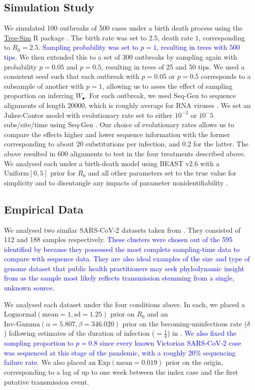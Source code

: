 \documentclass{article}
\begin{document}
{\subsection*{Simulation Study}
We simulated 100 outbreaks of 500 cases under a birth death process using the \url{Tree-Sim} R package \citep{TreeSim}. The birth rate was set to $2.5$, death rate $1$, corresponding to $R_{0} = 2.5$. \textcolor{blue}{Sampling probability was set to $p=1$, resulting in trees with 500 tips.} We then extended this to a set of 300 outbreaks by sampling again with probability $p=0.05$ and $p = 0.5$, resulting in trees of 25 and 50 tips. We used a consistent seed such that each outbreak with $p=0.05$ or $p=0.5$ corresponds to a subsample of another with $p=1$, allowing us to asses the effect of sampling proportion on inferring $W_{\bullet}$. For each outbreak, we used Seq-Gen to sequence alignments of length 20000, which is roughly average for RNA viruses \citep{sanjuan2010viral,rambaut_seq-gen_1997}. We set an Jukes-Cantor model with evolutionary rate set to either $10^{-3}$ or $10^-{5}$ subs/site/time using Seq-Gen \cite{rambaut_seq-gen_1997}.  Our choice of evolutionary rates allows us to compare the effects higher and lower sequence information with the former corresponding to about 20 substitutions per infection, and 0.2 for the latter. 
The above resulted in 600 alignments to test in the four treatments described above. We analysed each under a birth-death model using BEAST v2.6 \citet{bouckaert_beast_2019} with a $\textrm{Uniform}[0,5]$ prior for $R_0$ and all other parameters set to the true value for simplicity and to disentangle any impacts of parameter nonidentifiability \citep{louca2021fundamental}.

\subsection*{Empirical Data}
We analysed two similar SARS-CoV-2 datasets taken from \citet{lane2021genomics}. They consisted of 112 and 188 samples respectively. \textcolor{blue}{These clusters were chosen out of the 595 identified by \citet{lane2021genomics} because they possessed the most complete sampling-time data to compare with sequence data. They are also ideal examples of the size and type of genome dataset that public health practitioners may seek phylodynamic insight from as the sample most likely reflects transmission stemming from a single, unknown source.} 

We analysed  each dataset under the four conditions above. In each, we placed a $\textrm{Lognormal}(\textrm{mean}=1, \textrm{sd}=1.25)$ prior on $R_0$ and an $\textrm{Inv-Gamma}(\alpha=5.807, \beta=346.020)$ prior on the becoming-uninfectious rate ($\delta$) following estimates of the duration of infection ($=\frac{1}{\delta}$) in \cite{Lauer2020The}. \textcolor{blue}{We also fixed the sampling proportion to $p=0.8$ since every known Victorian SARS-CoV-2 case was sequenced at this stage of the pandemic, with a roughly 20\% sequencing failure rate.} We also placed an $\textrm{Exp}(\textrm{mean}=0.019)$ prior on the origin, corresponding to a lag of up to one week  between the index case and the first putative transmission event.

}
\end{document}
